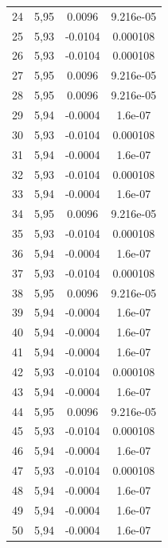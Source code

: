 \begin{longtable}{|c|c|c|c|}
24 & 5,95 & 0.0096 & 9.216e-05 \\  
25 & 5,93 & -0.0104 & 0.000108 \\  
26 & 5,93 & -0.0104 & 0.000108 \\  
27 & 5,95 & 0.0096 & 9.216e-05 \\  
28 & 5,95 & 0.0096 & 9.216e-05 \\  
29 & 5,94 & -0.0004 & 1.6e-07 \\  
30 & 5,93 & -0.0104 & 0.000108 \\  
31 & 5,94 & -0.0004 & 1.6e-07 \\  
32 & 5,93 & -0.0104 & 0.000108 \\  
33 & 5,94 & -0.0004 & 1.6e-07 \\  
34 & 5,95 & 0.0096 & 9.216e-05 \\  
35 & 5,93 & -0.0104 & 0.000108 \\  
36 & 5,94 & -0.0004 & 1.6e-07 \\  
37 & 5,93 & -0.0104 & 0.000108 \\  
38 & 5,95 & 0.0096 & 9.216e-05 \\  
39 & 5,94 & -0.0004 & 1.6e-07 \\  
40 & 5,94 & -0.0004 & 1.6e-07 \\  
41 & 5,94 & -0.0004 & 1.6e-07 \\  
42 & 5,93 & -0.0104 & 0.000108 \\  
43 & 5,94 & -0.0004 & 1.6e-07 \\  
44 & 5,95 & 0.0096 & 9.216e-05 \\  
45 & 5,93 & -0.0104 & 0.000108 \\  
46 & 5,94 & -0.0004 & 1.6e-07 \\  
47 & 5,93 & -0.0104 & 0.000108 \\  
48 & 5,94 & -0.0004 & 1.6e-07 \\  
49 & 5,94 & -0.0004 & 1.6e-07 \\  
50 & 5,94 & -0.0004 & 1.6e-07 \\  
\hline
\end{longtable}



